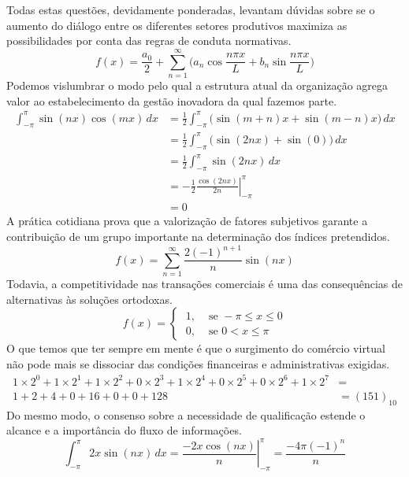 \begin{apendicesenv}
    Todas estas questões, devidamente ponderadas, levantam dúvidas sobre se o
    aumento do diálogo entre os diferentes setores produtivos maximiza as
    possibilidades por conta das regras de conduta normativas.
    \begin{equation}\label{eq:serie2}
        f(x) = \frac{a_{0}}{2}
        + \sum_{n=1}^{\infty} \Big( a_{n} \cos\frac{n\pi x}{L} + b_{n} \sin\frac{n\pi x}{L} \Big)
    \end{equation}
    Podemos vislumbrar o modo pelo qual a estrutura atual da organização agrega valor ao estabelecimento da gestão inovadora da qual fazemos parte.
    \begin{align*}
        \int_{-\pi}^{\pi} \sin(nx)\cos(mx)\,dx & =\frac{1}{2}\int_{-\pi}^{\pi}\Big(\sin(m+n)x+\sin(m-n)x\Big)\,dx \\[3mm]
                                               & =\frac{1}{2}\int_{-\pi}^{\pi}\Big(\sin(2nx)+\sin(0)\Big)\,dx     \\[3mm]
                                               & =\frac{1}{2}\int_{-\pi}^{\pi}\sin(2nx)\,dx                       \\[3mm]
                                               & =-\left.\frac{1}{2}\frac{\cos(2nx)}{2n}\right|_{-\pi}^{\pi}      \\[3mm]
                                               & =0
    \end{align*}
    A prática cotidiana
    prova que a valorização de fatores subjetivos garante a contribuição de um grupo
    importante na determinação dos índices pretendidos.
    \[
        f(x) = \sum_{n=1}^{\infty} \frac{2(-1)^{n+1}}{n} \sin(nx)
    \]
    Todavia, a competitividade
    nas transações comerciais é uma das consequências de alternativas às soluções
    ortodoxas.
    \[
        f(x) =
        \begin{cases}
            \; 1, & \text{ se }  -\pi \leq x \leq 0 \\
            \; 0, & \text{ se } 0 < x \leq \pi
        \end{cases}
    \]
    O que temos que ter sempre em mente é que o surgimento do comércio
    virtual não pode mais se dissociar das condições financeiras e administrativas
    exigidas.
    \begin{align*}
        1 \!\times\! 2^0 + 1 \!\times\! 2^1 + 1 \!\times\! 2^2 + 0 \!\times\! 2^3 +
        1 \!\times\! 2^4 + 0 \!\times\! 2^5 + 0 \!\times\! 2^6 + 1 \!\times\! 2^7 & =            \\
        1 + 2 + 4 + 0 + 16 + 0 + 0 + 128                                          & = (151)_{10}
    \end{align*}
    Do mesmo modo, o consenso sobre a necessidade de qualificação estende o alcance
    e a importância do fluxo de informações.
    \[
        \int_{-\pi}^{\pi} 2x\sin(nx)\,dx
        = \left.
        \frac{-2x\cos(nx)}{n}
        \right|_{-\pi}^{\pi}
        = \frac{-4\pi(-1)^n}{n}
    \]


\end{apendicesenv}

